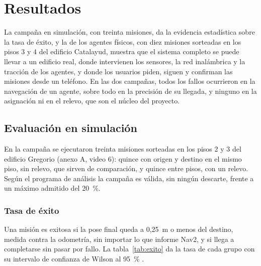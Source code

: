 \chapter{Resultados}
\label{cap:resultados}

La campaña en simulación, con treinta misiones, da la evidencia estadística sobre la tasa de éxito, y la de los agentes físicos, con diez misiones sorteadas en los pisos 3 y 4 del edificio Catalayud, muestra que el sistema completo se puede llevar a un edificio real, donde intervienen los sensores, la red inalámbrica y la tracción de los agentes, y donde los usuarios piden, siguen y confirman las misiones desde un teléfono. En las dos campañas, todos los fallos ocurrieron en la navegación de un agente, sobre todo en la precisión de su llegada, y ninguno en la asignación ni en el relevo, que son el núcleo del proyecto.

\section{Evaluación en simulación}
\label{sec:res-sim}

En la campaña se ejecutaron treinta misiones sorteadas en los pisos 2 y 3 del edificio Gregorio (anexo A, video 6): quince con origen y destino en el mismo piso, sin relevo, que sirven de comparación, y quince entre pisos, con un relevo. Según el programa de análisis la campaña es válida, sin ningún descarte, frente a un máximo admitido del 20~\%.

\subsection{Tasa de éxito}

Una misión es exitosa si la pose final queda a 0,25~m o menos del destino, medida contra la odometría, sin importar lo que informe Nav2, y si llega a completarse sin pasar por fallo. La tabla~\ref{tab:exito} da la tasa de cada grupo con su intervalo de confianza de Wilson al 95~\% \autocite{wilson1927probable}.

